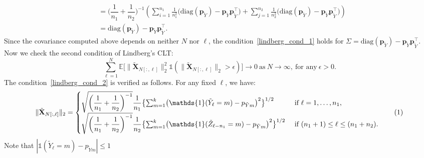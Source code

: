 \documentclass[twoside,11pt]{article}
\newcommand\numberthis{\addtocounter{equation}{1}\tag{\theequation}}
\newcommand{\indicator}[1]{\mathds{1}\left( #1 \right) }%
\newcommand{\rvTwo}{Y}
\newcommand{\rvThree}{Z}
\newcommand{\vectorize}[1]{\mathbf{#1}}
\newcommand{\rvX}{X} %
\newcommand{\rVecX}{\vectorize{\rvX}}
\newcommand{\rvY}{Y}
\newcommand{\mE}{\mathbb{E}} %
\newcommand{\alphabetSize}{k} %
\newcommand{\vectorIndex}{m}
\newcommand{\sampleSize}{n}
\newcommand{\probVecElement}[2]{p_{{#1}{#2}}}
\newcommand{\probVec}{\mathbf{p}} %
\begin{document}
\begin{appendix}
\begin{align*}
		&=
		\biggl( \dfrac{1}{\sampleSize_1}+\dfrac{1}{\sampleSize_2} \biggr)^{-1}
		\left(	\sum_{i=1}^{\sampleSize_1}
		\frac{1}{\sampleSize_1^2}
		\bigl(
		\text{diag}(\probVec_{\tilde{\rvTwo}}) - \probVec_{\tilde{\rvTwo}} \probVec_{\tilde{\rvTwo}}^\top
		\bigr)
		+
		\sum_{j=1}^{\sampleSize_2}
		\frac{1}{\sampleSize_2^2}
		\bigl(
		\text{diag}(\probVec_{\tilde{\rvTwo}}) - \probVec_{\tilde{\rvTwo}} \probVec_{\tilde{\rvTwo}}^\top
		\bigr)
		\right)
		\\&=
		\text{diag}(\probVec_{\tilde{\rvTwo}}) - \probVec_{\tilde{\rvTwo}} \probVec_{\tilde{\rvTwo}}^\top.
	\end{align*}
	Since the covariance computed above depends on neither $N$ nor $\ell$, the condition~\eqref{lindberg_cond_1} holds for $\Sigma = \text{diag}(\probVec_{\tilde{\rvTwo}}) - \probVec_{\tilde{\rvTwo}} \probVec_{\tilde{\rvTwo}}^\top.$
	Now we check the second condition of Lindberg's CLT:
	\begin{equation}\label{lindberg_cond_2}
		\sum_{\ell=1}^N
		\mE
		\bigl[
		\| \tilde{\rVecX}_{N[:,\ell]} \|_2^2
		\indicator{
			\|\tilde{\rVecX}_{N[:,\ell]}\|_2 > \epsilon
		}
		\bigr]
		\to 0~\text{as}~N \to \infty,~\text{for any}~\epsilon > 0.
	\end{equation}
	The condition~\eqref{lindberg_cond_2} is verified as follows. For any fixed $\ell$, we have:
	\begin{align*}
		\|\tilde{\rVecX}_{N[:,\ell]}\|_2
		=
		\begin{cases}
			\sqrt{\biggl( \dfrac{1}{\sampleSize_1}+\dfrac{1}{\sampleSize_2} \biggr)^{-1}}
			\dfrac{1}{\sampleSize_1}
			\bigl\{
			\sum_{\vectorIndex = 1}^\alphabetSize
			\bigl(
			\mathds{1}(\tilde{\rvTwo}_{\ell} = \vectorIndex)
			-  \probVecElement{\tilde{\rvTwo}}{\vectorIndex}
			\bigr)^2
			\bigr\}^{1/2}		
			~&\text{if}~
			\ell=1, \ldots, \sampleSize_1,
			\\
			\sqrt{\biggl( \dfrac{1}{\sampleSize_1}+\dfrac{1}{\sampleSize_2} \biggr)^{-1}}
			\dfrac{1}{\sampleSize_2}
			\bigl\{
			\sum_{\vectorIndex = 1}^\alphabetSize
			\bigl(
			\mathds{1}(\tilde{\rvThree}_{\ell-\sampleSize_1} = \vectorIndex)
			-
			\probVecElement{\tilde{\rvTwo}}{\vectorIndex}
			\bigr)^2
			\bigr\}^{1/2}
			~&\text{if}~
			(\sampleSize_1 + 1) \leq \ell \leq ( \sampleSize_1 + \sampleSize_2).		
		\end{cases}
		\numberthis \label{appendix:proof:genRR:norm}
	\end{align*}
	Note that
	$ | \mathds{1}(\tilde{\rvTwo}_{\ell} = \vectorIndex)  - \probVecElement{ \tilde{\rvY}}{\vectorIndex} |\leq 1$

\end{appendix}
\end{document}
